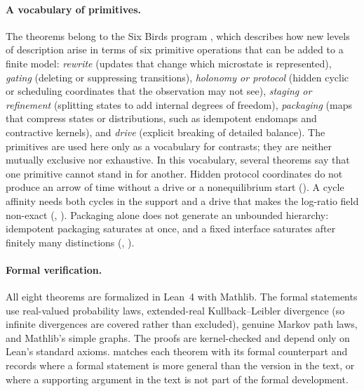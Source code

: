 \paragraph{A vocabulary of primitives.}
The theorems belong to the Six Birds program \citep{SB_FOUNDATIONS}, which describes how new levels of description arise in terms of six primitive operations that can be added to a finite model:
\emph{rewrite} (updates that change which microstate is represented),
\emph{gating} (deleting or suppressing transitions),
\emph{holonomy or protocol} (hidden cyclic or scheduling coordinates that the observation may not see),
\emph{staging or refinement} (splitting states to add internal degrees of freedom),
\emph{packaging} (maps that compress states or distributions, such as idempotent endomaps and contractive kernels),
and \emph{drive} (explicit breaking of detailed balance).
The primitives are used here only as a vocabulary for contrasts; they are neither mutually exclusive nor exhaustive.
In this vocabulary, several theorems say that one primitive cannot stand in for another.
Hidden protocol coordinates do not produce an arrow of time without a drive or a nonequilibrium start (\thmNGProtocolTrap).
A cycle affinity needs both cycles in the support and a drive that makes the log-ratio field non-exact (\thmNGForceForest, \thmNGForceNull).
Packaging alone does not generate an unbounded hierarchy: idempotent packaging saturates at once, and a fixed interface saturates after finitely many distinctions (\thmNGLadderIdem, \thmNGLadderBoundedInterface).

\paragraph{Formal verification.}
All eight theorems are formalized in Lean~4 with Mathlib.
The formal statements use real-valued probability laws, extended-real Kullback--Leibler divergence (so infinite divergences are covered rather than excluded), genuine Markov path laws, and Mathlib's simple graphs.
The proofs are kernel-checked and depend only on Lean's standard axioms.
 matches each theorem with its formal counterpart and records where a formal statement is more general than the version in the text, or where a supporting argument in the text is not part of the formal development.

